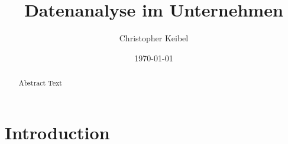 \documentclass{article}
\title{Datenanalyse im Unternehmen}
\author{Christopher Keibel}
\date{\today}
\begin{document}
\maketitle

\begin{abstract}
    Abstract Text
\end{abstract}


\section{Introduction}
\end{document}

